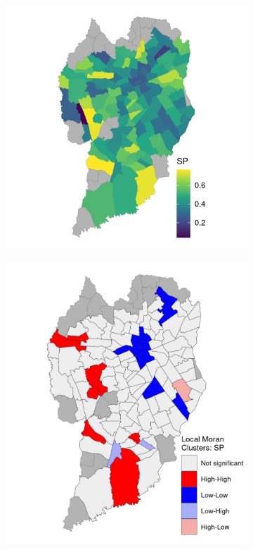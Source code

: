\begin{figure}[!htbp]
    \centering\footnotesize
    \captionsetup{font=footnotesize}
    \caption{SPEEDING PER TAZ}
    \begin{subfigure}{0.5\textwidth}
        \includegraphics{fig/taz_SP.png}
    \end{subfigure}%
    \begin{subfigure}{0.5\textwidth}
        \includegraphics{fig/lisa_SP.png}

\end{subfigure}
\end{figure}
